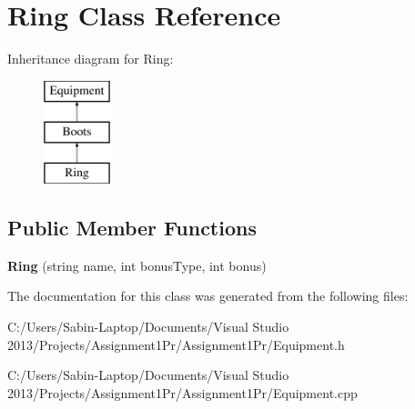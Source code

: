 \hypertarget{class_ring}{}\section{Ring Class Reference}
\label{class_ring}
Inheritance diagram for Ring\+:\begin{figure}[H]
\begin{center}
\leavevmode
\includegraphics[height=3.000000cm]{class_ring}
\end{center}
\end{figure}
\subsection*{Public Member Functions}
\begin{DoxyCompactItemize}
\item 
\hypertarget{class_ring_a0de07488827cea209426c1a319e7e570}{}\label{class_ring_a0de07488827cea209426c1a319e7e570} 
{\bfseries Ring} (string name, int bonus\+Type, int bonus)
\end{DoxyCompactItemize}


The documentation for this class was generated from the following files\+:\begin{DoxyCompactItemize}
\item 
C\+:/\+Users/\+Sabin-\/\+Laptop/\+Documents/\+Visual Studio 2013/\+Projects/\+Assignment1\+Pr/\+Assignment1\+Pr/Equipment.\+h\item 
C\+:/\+Users/\+Sabin-\/\+Laptop/\+Documents/\+Visual Studio 2013/\+Projects/\+Assignment1\+Pr/\+Assignment1\+Pr/Equipment.\+cpp\end{DoxyCompactItemize}
